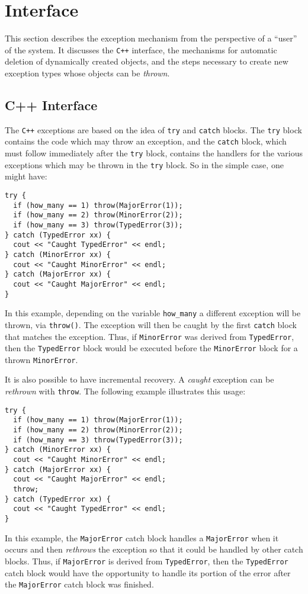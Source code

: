\section{Interface}

This section describes the exception mechanism from the 
perspective of a ``user'' of the system. It discusses the {\tt C++}
interface, the
mechanisms for automatic deletion of dynamically created objects, and the
steps necessary to create new exception types whose objects can be 
{\em thrown}.

\subsection{C++ Interface}

The {\tt C++} exceptions are based on the idea of {\tt try} and 
{\tt catch} blocks. The {\tt try} block contains the code
which may throw an exception, and the {\tt catch} block, which
must follow immediately after the {\tt try} block,
contains the handlers for the various exceptions which may be thrown in the
{\tt try} block. So in the simple case, one might have:
\begin{verbatim}
try {
  if (how_many == 1) throw(MajorError(1));
  if (how_many == 2) throw(MinorError(2));
  if (how_many == 3) throw(TypedError(3));
} catch (TypedError xx) {
  cout << "Caught TypedError" << endl;
} catch (MinorError xx) {
  cout << "Caught MinorError" << endl;
} catch (MajorError xx) {
  cout << "Caught MajorError" << endl;
}
\end{verbatim}
\noindent
In this example, depending on the variable 
{\tt how\_many} a different exception will be thrown, via {\tt throw()}.
The exception will then be caught by the first {\tt catch} block that
matches the exception. Thus, if {\tt MinorError} was derived from 
{\tt TypedError}, then the {\tt TypedError} block would be executed before 
the {\tt MinorError} block for a thrown {\tt MinorError}. 

It is also possible to have incremental recovery. A {\em caught} exception
can be {\em rethrown} with {\tt throw}. The following example 
illustrates this usage:
\begin{verbatim}
try {
  if (how_many == 1) throw(MajorError(1));
  if (how_many == 2) throw(MinorError(2));
  if (how_many == 3) throw(TypedError(3));
} catch (MinorError xx) {
  cout << "Caught MinorError" << endl;
} catch (MajorError xx) {
  cout << "Caught MajorError" << endl;
  throw;
} catch (TypedError xx) {
  cout << "Caught TypedError" << endl;
}
\end{verbatim}
\noindent
In this example, the {\tt MajorError} catch block handles a {\tt MajorError}
when it occurs and then {\em rethrows} the exception so that it could be
handled by other catch blocks. Thus, if {\tt MajorError} is derived from
{\tt TypedError}, then the {\tt TypedError} catch block would have the
opportunity to handle its portion of the error after the {\tt MajorError}
catch block was finished. 


